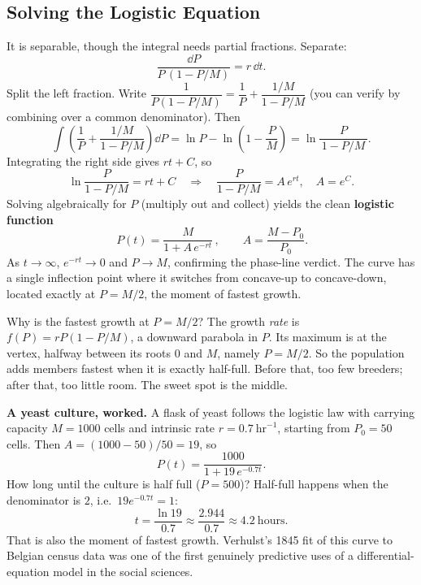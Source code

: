 \subsection{Solving the Logistic Equation}

It is separable, though the integral needs partial fractions. Separate:
\[
  \frac{\dd P}{P\,(1 - P/M)} = r\,\dd t.
\]
Split the left fraction. Write $\dfrac{1}{P(1-P/M)} = \dfrac{1}{P} +
\dfrac{1/M}{1-P/M}$ (you can verify by combining over a common denominator). Then
\[
  \int\!\left(\frac{1}{P} + \frac{1/M}{1-P/M}\right)\dd P
  = \ln P - \ln\!\left(1 - \frac{P}{M}\right) = \ln\frac{P}{\,1-P/M\,}.
\]
Integrating the right side gives $rt+C$, so
\[
  \ln\frac{P}{1-P/M} = rt + C
  \quad\Longrightarrow\quad
  \frac{P}{1-P/M} = A\,e^{rt}, \quad A=e^{C}.
\]
Solving algebraically for $P$ (multiply out and collect) yields the clean
\textbf{logistic function}
\[
  \boxed{\,P(t) = \frac{M}{1 + A\,e^{-rt}}\,},\qquad
  A = \frac{M - P_0}{P_0}.
\]
As $t\to\infty$, $e^{-rt}\to 0$ and $P\to M$, confirming the phase-line verdict. The
curve has a single inflection point where it switches from concave-up to
concave-down, located exactly at $P=M/2$, the moment of fastest growth.

\begin{walkbox}
Why is the fastest growth at $P=M/2$? The growth \emph{rate} is
$f(P)=rP(1-P/M)$, a downward parabola in $P$. Its maximum is at the vertex, halfway
between its roots $0$ and $M$, namely $P=M/2$. So the population adds members
fastest when it is exactly half-full. Before that, too few breeders; after that, too
little room. The sweet spot is the middle.
\end{walkbox}

\begin{applicationbox}
\textbf{A yeast culture, worked.} A flask of yeast follows the logistic law with
carrying capacity $M=1000$ cells and intrinsic rate $r=0.7\ \text{hr}^{-1}$,
starting from $P_0=50$ cells. Then $A=(1000-50)/50 = 19$, so
\[
  P(t) = \frac{1000}{1 + 19\,e^{-0.7t}}.
\]
How long until the culture is half full ($P=500$)? Half-full happens when the
denominator is $2$, i.e.\ $19e^{-0.7t}=1$:
\[
  t = \frac{\ln 19}{0.7} \approx \frac{2.944}{0.7}\approx 4.2\ \text{hours}.
\]
That is also the moment of fastest growth. Verhulst's 1845 fit of this curve to
Belgian census data was one of the first genuinely predictive uses of a
differential-equation model in the social sciences.
\end{applicationbox}

